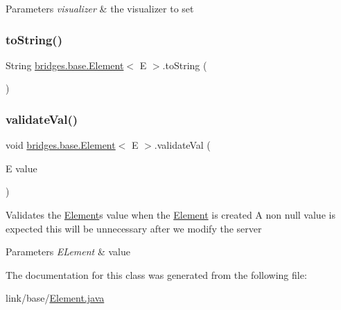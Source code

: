 \begin{DoxyParams}{Parameters}
{\em visualizer} & the visualizer to set \\
\hline
\end{DoxyParams}
\hypertarget{classbridges_1_1base_1_1_element_a7dc685e317fd9dc2e73e049a9f907e42}{}\label{classbridges_1_1base_1_1_element_a7dc685e317fd9dc2e73e049a9f907e42} 
\subsubsection{\texorpdfstring{to\+String()}{toString()}}
{\footnotesize\ttfamily String \hyperlink{classbridges_1_1base_1_1_element}{bridges.\+base.\+Element}$<$ E $>$.to\+String (\begin{DoxyParamCaption}{ }\end{DoxyParamCaption})}

\hypertarget{classbridges_1_1base_1_1_element_af1a60f4e6a91d379179f7d56e6dc3829}{}\label{classbridges_1_1base_1_1_element_af1a60f4e6a91d379179f7d56e6dc3829} 
\subsubsection{\texorpdfstring{validate\+Val()}{validateVal()}}
{\footnotesize\ttfamily void \hyperlink{classbridges_1_1base_1_1_element}{bridges.\+base.\+Element}$<$ E $>$.validate\+Val (\begin{DoxyParamCaption}\item[{E}]{value }\end{DoxyParamCaption})\hspace{0.3cm}{\ttfamily [protected]}}

Validates the \hyperlink{classbridges_1_1base_1_1_element}{Element}\textquotesingle{}s value when the \hyperlink{classbridges_1_1base_1_1_element}{Element} is created A non null value is expected this will be unnecessary after we modify the server 
\begin{DoxyParams}{Parameters}
{\em E\+Lement} & value \\
\hline
\end{DoxyParams}


The documentation for this class was generated from the following file\+:\begin{DoxyCompactItemize}
\item 
link/base/\hyperlink{_element_8java}{Element.\+java}\end{DoxyCompactItemize}
